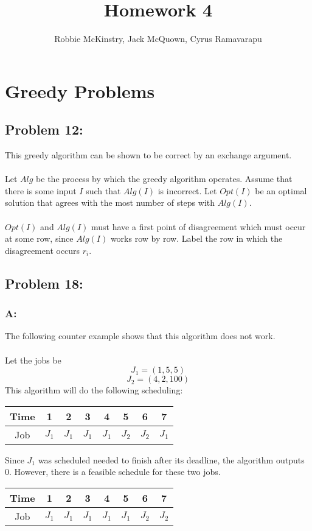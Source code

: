 \documentclass[12pt]{article}
\begin{document}
\title{Homework 4}
\author{Robbie McKinstry, Jack McQuown, Cyrus Ramavarapu}
\renewcommand{\today}{9 September 2016}
\renewcommand{\baselinestretch}{1.5}

\maketitle

\section*{Greedy Problems}
\subsection*{Problem 12:}
This greedy algorithm can be shown to be correct by an exchange argument.\\\\
Let $Alg$ be the process by which the greedy algorithm operates.  Assume that
there is some input $I$ such that $Alg(I)$ is incorrect. Let $Opt(I)$ be an
optimal solution that agrees with the most number of steps with $Alg(I)$.\\\\
$Opt(I)$ and $Alg(I)$ must have a first point of disagreement which must occur
at some row, since $Alg(I)$ works row by row.  Label the row in which the
disagreement occurs $r_i$.  
\subsection*{Problem 18:}
\subsubsection*{A:}
The following counter example shows that this algorithm does not work.\\\\
Let the jobs be
\[
J_1=(1,5,5)
\]
\[
J_2=(4,2,100)
\]
This algorithm will do the following scheduling:\\
\begin{center}
    \begin{tabular}{c|c|c|c|c|c|c|c}
    Time & 1 & 2 & 3 & 4 & 5 & 6 & 7 \\ \hline
    Job & $J_1$ & $J_1$ & $J_1$ & $J_1$ & $J_2$ & $J_2$ & $J_1$ \\
    \end{tabular}
\end{center}  
Since $J_1$ was scheduled needed to finish after its deadline, the algorithm
outputs $0$.  However, there is a feasible schedule for these two jobs.\\
\begin{center}
    \begin{tabular}{c|c|c|c|c|c|c|c}
    Time & 1 & 2 & 3 & 4 & 5 & 6 & 7 \\ \hline
    Job & $J_1$ & $J_1$ & $J_1$ & $J_1$ & $J_1$ & $J_2$ & $J_2$ \\
    \end{tabular}
\end{center}  
\end{document}
